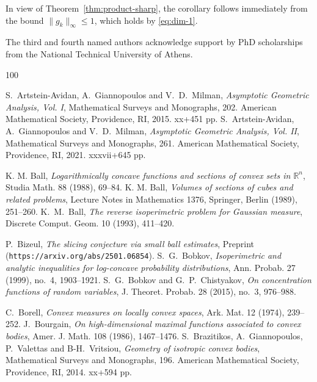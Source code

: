 \documentclass[11pt,leqno]{article}
\theoremstyle{remark}
\numberwithin{equation}{section}
\newcommand{\ls}{\leqslant}
\begin{document}
In view of Theorem~\ref{thm:product-sharp}, the corollary follows immediately from the bound $\|g_k\|_\infty\ls 1$, 
which holds by \eqref{eq:dim-1}.




\bigskip

 The third and fourth named authors acknowledge support by PhD scholarships from the National Technical University of Athens.

\bigskip 


\footnotesize

\begin{thebibliography}{100}
\footnotesize



 \textrm{S.\ Artstein-Avidan, A.\ Giannopoulos and V.\ D.\ Milman},
\textit{Asymptotic Geometric Analysis, Vol. I}, Mathematical Surveys and Monographs, 202.
American Mathematical Society, Providence, RI, 2015. xx+451 pp.
 \textrm{S.\ Artstein-Avidan, A.\ Giannopoulos and V.\ D.\ Milman},
\textit{Asymptotic Geometric Analysis, Vol. II}, Mathematical Surveys and Monographs, 261.
American  Mathematical Society, Providence, RI, 2021. xxxvii+645 pp.

 \textrm{K. M. Ball}, \textit{Logarithmically concave functions and sections of convex sets in ${\mathbb R}^n$},
Studia Math. {88} (1988), 69--84.
 \textrm{K. M. Ball}, \textit{Volumes of sections of cubes and related problems}, Lecture Notes in Mathematics {1376}, Springer,
Berlin (1989), 251--260.
 \textrm{K.~M.~Ball}, \textit{The reverse isoperimetric problem for Gaussian measure},
Discrete Comput. Geom. 10 (1993), 411--420.

 \textrm{P.\ Bizeul}, \textit{The slicing conjecture via small ball estimates},
Preprint ({\tt https://arxiv.org/abs/2501.06854}).
 \textrm{S.~G.~Bobkov}, \textit{Isoperimetric and analytic inequalities for log-concave probability distributions}, 
Ann. Probab. 27 (1999), no.~4, 1903--1921.
 \textrm{S.~G.~Bobkov and G.~P.~Chistyakov}, \textit{On concentration functions of random variables}, J. Theoret. Probab. 28 (2015), no.~3, 976--988.

 \textrm{C.\ Borell}, \textit{Convex measures on locally convex spaces},
Ark. Mat. {12} (1974), 239--252.
 \textrm{J.\ Bourgain}, \textit{On high-dimensional maximal functions associated to convex bodies},
Amer. J. Math. {108} (1986), 1467--1476.
 \textrm{S.\ Brazitikos, A.\ Giannopoulos, P.\ Valettas and B-H.\ Vritsiou},
\textit{Geometry of isotropic convex bodies}, Mathematical Surveys and Monographs, 196.
American Mathematical Society, Providence, RI, 2014. xx+594 pp.


\end{thebibliography}
\end{document}
